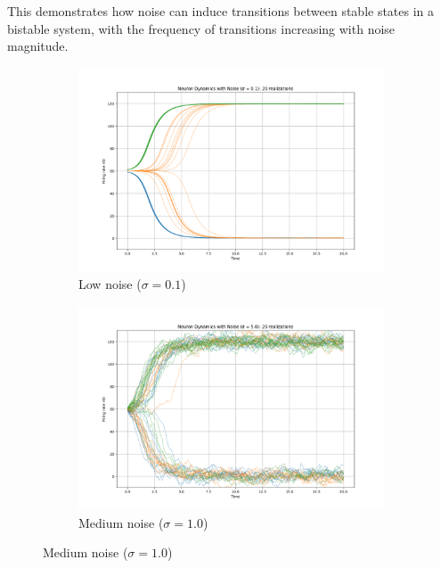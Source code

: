 \documentclass{article}
\begin{document}
This demonstrates how noise can induce transitions between stable states in a bistable system, with the frequency of transitions increasing with noise magnitude.

\begin{figure}[H]
    \centering
    \begin{subfigure}[b]{0.48\textwidth}
        \includegraphics[width=\textwidth]{noise_strength_0.1.png}
        \caption{Low noise ($\sigma = 0.1$)}
        \label{fig:noise_low}
    \end{subfigure}
    \hfill
    \begin{subfigure}[b]{0.48\textwidth}
        \includegraphics[width=\textwidth]{noise_strength_5.0.png}
        \caption{Medium noise ($\sigma = 1.0$)}
        \label{fig:noise_medium}
    \end{subfigure}
    

\end{figure}
\end{document}
